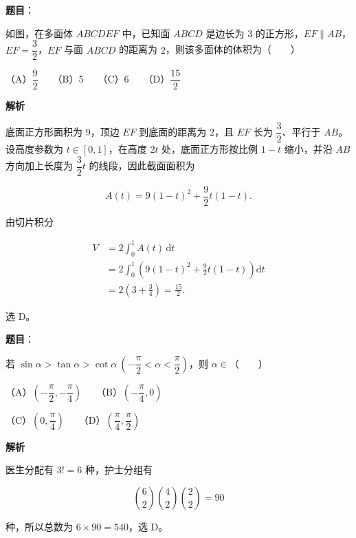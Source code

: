 \begin{answer}

\textbf{题目}：

如图，在多面体 $ABCDEF$ 中，已知面 $ABCD$ 是边长为 $3$ 的正方形，$EF\parallel AB$，$EF=\dfrac32$，$EF$ 与面 $ABCD$ 的距离为 $2$，则该多面体的体积为\mbox{（　　）}
\nopagebreak[4]
\begin{center}\end{center}
\nopagebreak[4]
（A）$\dfrac92$　　（B）5　　（C）6　　（D）$\dfrac{15}2$

\textbf{解析}

底面正方形面积为 $9$，顶边 $EF$ 到底面的距离为 $2$，且 $EF$ 长为 $\dfrac32$、平行于 $AB$。设高度参数为 $t\in[0,1]$，在高度 $2t$ 处，底面正方形按比例 $1-t$ 缩小，并沿 $AB$ 方向加上长度为 $\dfrac32t$ 的线段，因此截面面积为

\nopagebreak[4]
\[
A(t)=9(1-t)^2+\frac92t(1-t).
\]

由切片积分

\nopagebreak[4]
\[
\begin{aligned}
V
&=2\int_0^1A(t)\,\mathrm dt\\
&=2\int_0^1\left(9(1-t)^2+\frac92t(1-t)\right)\mathrm dt\\
&=2\left(3+\frac34\right)
=\frac{15}{2}.
\end{aligned}
\]

选 D。


\end{answer}
\begin{answer}

\textbf{题目}：

若 $\sin\alpha>\tan\alpha>\cot\alpha\ \left(-\dfrac\pi2<\alpha<\dfrac\pi2\right)$，则 $\alpha\in$\mbox{（　　）}

（A）$\left(-\dfrac\pi2,-\dfrac\pi4\right)$　　（B）$\left(-\dfrac\pi4,0\right)$

（C）$\left(0,\dfrac\pi4\right)$　　（D）$\left(\dfrac\pi4,\dfrac\pi2\right)$

\textbf{解析}

医生分配有 $3!=6$ 种，护士分组有

\nopagebreak[4]
\[
\binom62\binom42\binom22=90
\]

种，所以总数为 $6\times90=540$，选 D。


\end{answer}
